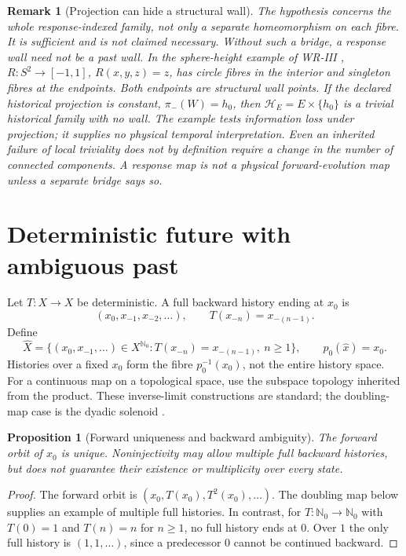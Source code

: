 \documentclass[11pt]{article}
\newtheorem{proposition}[definition]{Proposition}
\newtheorem{remark}[definition]{Remark}
\begin{document}
\begin{remark}[Projection can hide a structural wall]
\label{rem:wall-erasure}
The hypothesis concerns the whole response-indexed family, not
only a separate homeomorphism on each fibre. It is sufficient and
is not claimed necessary. Without such a bridge, a response wall
need not be a past wall. In the sphere-height example of WR-III
\cite[Section 10]{WRIII}, $R:S^2\to[-1,1]$, $R(x,y,z)=z$,
has circle fibres in the interior and singleton fibres at the
endpoints. Both endpoints are structural wall points. If the
declared historical projection is constant, $\pi_-(W)=h_0$, then
$\mathcal H_E=E\times\{h_0\}$ is a trivial historical family
with no wall. The example tests information loss under projection;
it supplies no physical temporal interpretation. Even an inherited
failure of local triviality does not by definition require a change
in the number of connected components. A response map is not a
physical forward-evolution map unless a separate bridge says so.
\end{remark}

\section{Deterministic future with ambiguous past}
Let $T:X\to X$ be deterministic. A full backward history ending at $x_0$ is
\[
(x_0,x_{-1},x_{-2},\ldots),
\qquad T(x_{-n})=x_{-(n-1)}.
\]
Define
\[
\widehat X=\{(x_0,x_{-1},\ldots)\in X^{\mathbb N_0}:
T(x_{-n})=x_{-(n-1)},\ n\ge1\},
\qquad p_0(\widehat x)=x_0.
\]
Histories over a fixed $x_0$ form the fibre $p_0^{-1}(x_0)$,
not the entire history space. For a continuous map on a topological
space, use the subspace topology inherited from the product.
These inverse-limit constructions are standard; the doubling-map
case is the dyadic solenoid \cite[Section 1]{ClarkFokkink2004}.
\begin{proposition}[Forward uniqueness and backward ambiguity]
\label{prop:forward-backward}
The forward orbit of $x_0$ is unique. Noninjectivity may allow
multiple full backward histories, but does not guarantee their
existence or multiplicity over every state.
\end{proposition}
\begin{proof}
The forward orbit is $(x_0,T(x_0),T^2(x_0),\ldots)$.
The doubling map below supplies an example of multiple full histories.
In contrast, for $T:\mathbb N_0\to\mathbb N_0$ with $T(0)=1$ and
$T(n)=n$ for $n\ge1$, no full history ends at $0$. Over $1$ the only
full history is $(1,1,\ldots)$, since a predecessor $0$ cannot be
continued backward.
\end{proof}
\end{document}
